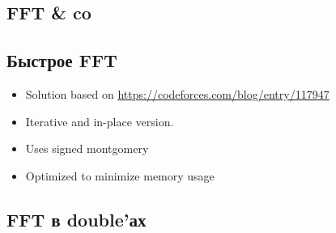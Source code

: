 \subsection{FFT \& co}


\subsection{Быстрое FFT}
\begin{itemize}
    \item Solution based on \underline{\url{https://codeforces.com/blog/entry/117947}}
    \item Iterative and in-place version.
    \item Uses signed montgomery
    \item Optimized to minimize memory usage
\end{itemize}

\subsection{FFT в double'ах}

